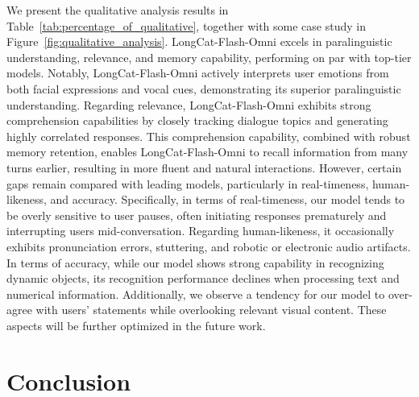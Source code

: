 \documentclass{article}
\begin{document}
We present the qualitative analysis results in Table~\ref{tab:percentage_of_qualitative}, together with some case study in Figure~\ref{fig:qualitative_analysis}.
LongCat-Flash-Omni excels in paralinguistic understanding, relevance, and memory capability, performing on par with top-tier models. 
Notably, LongCat-Flash-Omni actively interprets user emotions from both facial expressions and vocal cues, demonstrating its superior paralinguistic understanding. 
Regarding relevance, LongCat-Flash-Omni exhibits strong comprehension capabilities by closely tracking dialogue topics and generating highly correlated responses. 
This comprehension capability, combined with robust memory retention, enables LongCat-Flash-Omni to recall information from many turns earlier, resulting in more fluent and natural interactions. 
However, certain gaps remain compared with leading models, particularly in real-timeness, human-likeness, and accuracy. Specifically, in terms of real-timeness, our model tends to be overly sensitive to user pauses, often initiating responses prematurely and interrupting users mid-conversation. Regarding human-likeness, it occasionally exhibits pronunciation errors, stuttering, and robotic or electronic audio artifacts. In terms of accuracy, while our model shows strong capability in recognizing dynamic objects, its recognition performance declines when processing text and numerical information. Additionally, we observe a tendency for our model to over-agree with users’ statements while overlooking relevant visual content.
These aspects will be further optimized in the future work.



\section{Conclusion} %
\label{sec8:conclusion}
\end{document}

